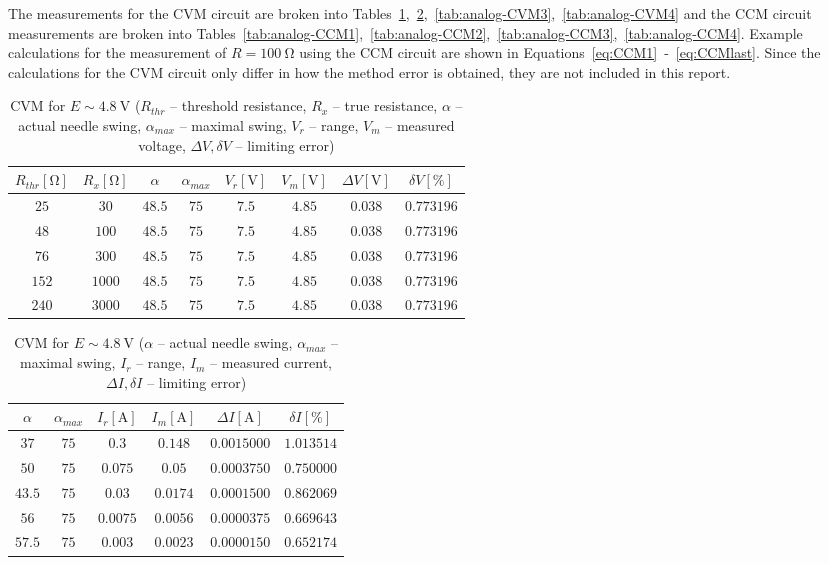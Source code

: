 The measurements for the CVM circuit are broken into Tables~\ref{tab:analog-CVM1},~\ref{tab:analog-CVM2},~\ref{tab:analog-CVM3},~\ref{tab:analog-CVM4} and the CCM circuit measurements are broken into Tables~\ref{tab:analog-CCM1},~\ref{tab:analog-CCM2},~\ref{tab:analog-CCM3},~\ref{tab:analog-CCM4}. Example calculations for the measurement of $R = \SI{100}{\ohm}$ using the CCM circuit are shown in Equations~\ref{eq:CCM1}~-~\ref{eq:CCMlast}. Since the calculations for the CVM circuit only differ in how the method error is obtained, they are not included in this report.

\begin{table}[H]
	\centering
	\begin{tabular}{ c| c | c | c | c | c | c | c}
		$R_{thr} [\unit{\ohm}]$ & $R_x [\unit{\ohm}]$& $\alpha$ & $\alpha_{max}$ & $V_r [\unit{\volt}]$ & $V_m [\unit{\volt}]$ & $\Delta V [\unit{\volt}]$ & $\delta V [\unit{\percent}]$ \\
		\hline
		$25$ & $30$ & $48.5$ & $75$ & $7.5$ & $4.85$ & $0.038$ & $0.773196$ \\
		$48$ & $100$ & $48.5$ & $75$ & $7.5$ & $4.85$ & $0.038$ & $0.773196$ \\
		$76$ & $300$ & $48.5$ & $75$ & $7.5$ & $4.85$ & $0.038$ & $0.773196$ \\
		$152$ & $1000$ & $48.5$ & $75$ & $7.5$ & $4.85$ & $0.038$ & $0.773196$ \\
		$240$ & $3000$ & $48.5$ & $75$ & $7.5$ & $4.85$ & $0.038$ & $0.773196$ \\
	\end{tabular}
	\caption{CVM for $E\sim\SI{4.8}{\volt}$ ($R_{thr}$ -- threshold resistance, $R_x$ -- true resistance, $\alpha$ -- actual needle swing, $\alpha_{max}$ -- maximal swing, $V_r$ -- range, $V_m$ -- measured voltage, $\Delta V, \delta V$ -- limiting error)}
	\label{tab:analog-CVM1}
\end{table}

\begin{table}[H]
	\centering
	\begin{tabular}{  c | c | c | c | c | c}
		$\alpha$ & $\alpha_{max}$ & $I_r [\unit{\ampere}]$ & $I_m [\unit{\ampere}]$ & $\Delta I [\unit{\ampere}]$ & $\delta I [\unit{\percent}]$ \\
		\hline
		$37$ & $75$ & $0.3$ & $0.148$ & $0.0015000$ & $1.013514$ \\
		$50$ & $75$ & $0.075$ & $0.05$ & $0.0003750$ & $0.750000$ \\
		$43.5$ & $75$ & $0.03$ & $0.0174$ & $0.0001500$ & $0.862069$ \\
		$56$ & $75$ & $0.0075$ & $0.0056$ & $0.0000375$ & $0.669643$ \\
		$57.5$ & $75$ & $0.003$ & $0.0023$ & $0.0000150$ & $0.652174$ \\
	\end{tabular}
	\caption{CVM for $E\sim\SI{4.8}{\volt}$ ($\alpha$ -- actual needle swing, $\alpha_{max}$ -- maximal swing, $I_r$ -- range, $I_m$ -- measured current, $\Delta I, \delta I$ -- limiting error)}
	\label{tab:analog-CVM2}
\end{table}

